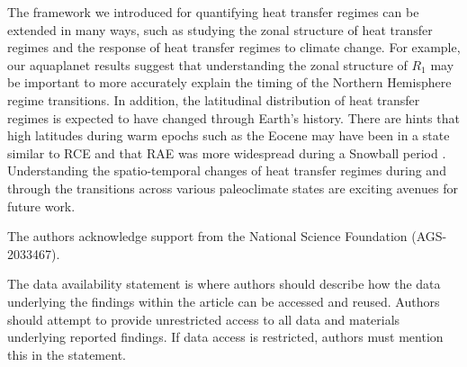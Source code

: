 \documentclass{ametsocV5}
\begin{document}
The framework we introduced for quantifying heat transfer regimes can be extended in many ways, such as studying the zonal structure of heat transfer regimes and the response of heat transfer regimes to climate change. For example, our aquaplanet results suggest that understanding the zonal structure of $R_1$ may be important to more accurately explain the timing of the Northern Hemisphere regime transitions. In addition, the latitudinal distribution of heat transfer regimes is expected to have changed through Earth's history. There are hints that high latitudes during warm epochs such as the Eocene may have been in a state similar to RCE \citep{abbot2008a} and that RAE was more widespread during a Snowball period \citep{pierrehumbert2005}. Understanding the spatio-temporal changes of heat transfer regimes during and through the transitions across various paleoclimate states are exciting avenues for future work.

\acknowledgments
The authors acknowledge support from the National Science Foundation (AGS-2033467).

% 
%
\datastatement
The data availability statement is where authors should describe how the data underlying 
the findings within the article can be accessed and reused. Authors should attempt to 
provide unrestricted access to all data and materials underlying reported findings. 
If data access is restricted, authors must mention this in the statement.

%



\end{document}
